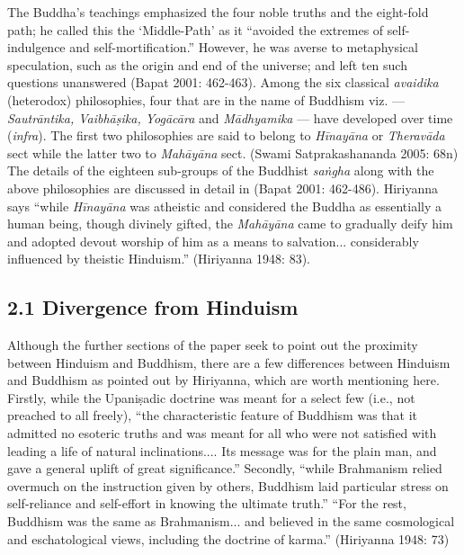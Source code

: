 The Buddha’s teachings emphasized the four noble truths and the eight-fold path; he called this the ‘Middle-Path’ as it “avoided the extremes of self-indulgence and self-mortification.” However, he was averse to metaphysical speculation, such as the origin and end of the universe; and left ten such questions unanswered (Bapat 2001: 462-463). Among the six classical \textit{avaidika} (heterodox) philosophies, four that are in the name of Buddhism viz. — \textit{Sautrāntika, Vaibhāṣika, Yogācāra} and \textit{Mādhyamika} — have developed over time (\textit{infra}). The first two philosophies are said to belong to \textit{Hīnayāna} or \textit{Theravāda} sect while the latter two to \textit{Mahāyāna} sect. (Swami Satprakashananda 2005: 68n) The details of the eighteen sub-groups of the Buddhist \textit{saṅgha} along with the above philosophies are discussed in detail in (Bapat 2001: 462-486). Hiriyanna says “while \textit{Hīnayāna} was atheistic and considered the Buddha as essentially a human being, though divinely gifted, the \textit{Mahāyāna} came to gradually deify him and adopted devout worship of him as a means to salvation... considerably influenced by theistic Hinduism.” (Hiriyanna 1948: 83).

\subsection*{2.1 Divergence from Hinduism}

Although the further sections of the paper seek to point out the proximity between Hinduism and Buddhism, there are a few differences between Hinduism and Buddhism as pointed out by Hiriyanna, which are worth mentioning here. Firstly, while the Upaniṣadic doctrine was meant for a select few (i.e., not preached to all freely), “the characteristic feature of Buddhism was that it admitted no esoteric truths and was meant for all who were not satisfied with leading a life of natural inclinations.... Its message was for the plain man, and gave a general uplift of great significance.” Secondly, “while Brahmanism relied overmuch on the instruction given by others, Buddhism laid particular stress on self-reliance and self-effort in knowing the ultimate truth.” “For the rest, Buddhism was the same as Brahmanism... and believed in the same cosmological and eschatological views, including the doctrine of karma.” (Hiriyanna 1948: 73)

